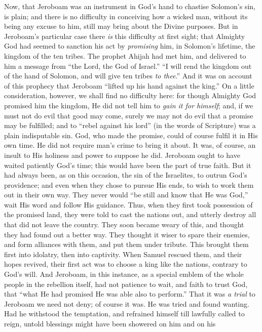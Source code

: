 Now, that Jeroboam was an instrument in God's hand to chastise
Solomon's sin, is plain; and there is no difficulty in conceiving
how a wicked man, without its being any excuse to him, still may bring
about the Divine purposes. But in Jeroboam's particular case there \emph{is}
this difficulty at first sight; that Almighty God had seemed to
sanction his act by \emph{promising} him, in Solomon's lifetime, the
kingdom of the ten tribes. The prophet Ahijah had met him, and
delivered to him a message from ``the Lord, the God of
Israel.'' ``I will rend the kingdom out of the hand of
Solomon, and will give ten tribes \emph{to thee}.'' And it was on
account of this prophecy that Jeroboam ``lifted up his hand
against the king.'' On a little consideration, however, we shall
find no difficulty here: for though Almighty God promised him the
kingdom, He did not tell him to \emph{gain it for himself}; and, if we
must not do evil that good may come, surely we may not do evil that a
promise may be fulfilled; and to ``rebel against his lord''
(in the words of Scripture) was a plain indisputable sin. God, who
made the promise, could of course fulfil it in His own time. He did
not require man's crime to bring it about. It was, of course, an
insult to His holiness and power to suppose he did. Jeroboam ought to
have waited patiently God's time; this would have been the part of
true faith. But it had always been, as on this occasion, the sin of
the Israelites, to outrun God's providence; and even when they chose
to pursue His ends, to wish to work them out in their own way. They never
would ``be still and know that He was God,'' wait His word and
follow His guidance. Thus, when they first took possession of the
promised land, they were told to cast the nations out, and utterly
destroy all that did not leave the country. They soon became weary of
this, and thought they had found out a better way. They thought it
wiser to spare their enemies, and form alliances with them, and put
them under tribute. This brought them first into idolatry, then into
captivity. When Samuel rescued them, and their hopes revived, their
first act was to choose a king like the nations, contrary to God's
will. And Jeroboam, in this instance, as a special emblem of the whole
people in the rebellion itself, had not patience to wait, and faith to
trust God, that ``what He had promised He was able also to
perform.'' That it was \emph{a trial} to Jeroboam we need not
deny; of course it was. He was tried and found wanting. Had he
withstood the temptation, and refrained himself till lawfully called
to reign, untold blessings might have been showered on him and on his
